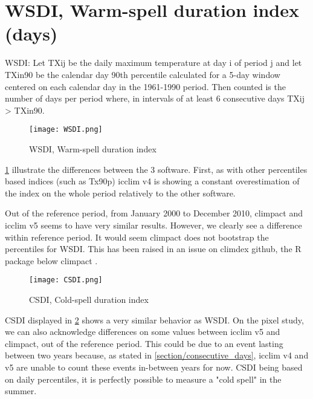 \documentclass[a4paper,11pt]{article}
\begin{document}
    \section{WSDI, Warm-spell duration index (days)}
        WSDI: Let TXij be the daily maximum temperature at day i of period j and let
        TXin90 be the calendar day 90th percentile calculated for a 5-day window centered on each calendar day in the 1961-1990 period.
        Then counted is the number of days per period where, in intervals of at least 6 consecutive days TXij > TXin90.

        \begin{figure}[!hbt]
            \centering
            \texttt{[image: WSDI.png]}
            \caption{WSDI, Warm-spell duration index}
            \label{figure/wsdi}
        \end{figure}
        
        \ref{figure/wsdi} illustrate the differences between the 3 software.
        First, as with other percentiles based indices (such as Tx90p) icclim v4 is showing a constant overestimation of the index on the whole period relatively to the other software.

        Out of the reference period, from January 2000 to December 2010, climpact and icclim v5 seems to have very similar results.
        However, we clearly see a difference within reference period. It would seem climpact does not bootstrap the percentiles for WSDI.
        This has been raised in an issue on climdex github, the R package below climpact \cite{gh/wsdi_issue}.
    
        \begin{figure}[!hbt]
            \centering
            \texttt{[image: CSDI.png]}
            \caption{CSDI, Cold-spell duration index}
            \label{figure/csdi}
        \end{figure}

        CSDI displayed in \ref{figure/csdi} shows a very similar behavior as WSDI.
        On the pixel study, we can also acknowledge differences on some values between icclim v5 and climpact, out of the reference period.
        This could be due to an event lasting between two years because, as stated in \ref{section/consecutive_days}, icclim v4 and v5 are unable to count these events in-between years for now.
        CSDI being based on daily percentiles, it is perfectly possible to measure a "cold spell" in the summer. 
    
\end{document}
